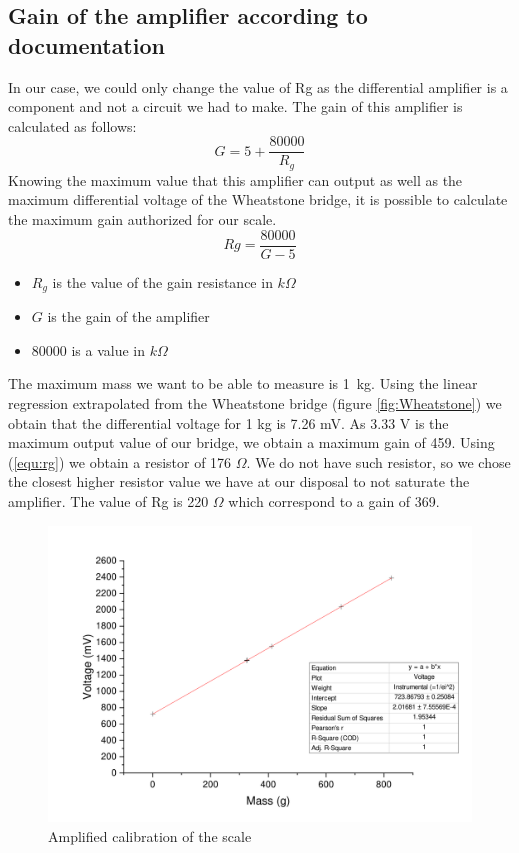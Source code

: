 \documentclass{article}[12pt]
\begin{document}
\subsection{Gain of the amplifier according to documentation}
In our case, we could only change the value of Rg as the differential amplifier is a component and not a circuit we had to make. The gain of this amplifier is calculated as follows:
\begin{equation}
    G=5+\dfrac{80000}{R_g}
\end{equation}
Knowing the maximum value that this amplifier can output as well as the maximum differential voltage of the Wheatstone bridge, it is possible to calculate the maximum gain authorized for our scale.
\begin{equation}
    Rg= \dfrac{80000}{G-5}
    \label{equ:rg}
\end{equation}
\begin{itemize}
    \item $R_g$ is the value of the gain resistance in $k\Omega$
    \item $G$ is the gain of the amplifier
    \item $80000$ is a value in $k\Omega$
\end{itemize}
The maximum mass we want to be able to measure is 1 kg.
Using the linear regression extrapolated from the Wheatstone bridge (figure \ref{fig:Wheatstone}) we obtain that the differential voltage for 1 kg is 7.26 mV.
As 3.33 V is the maximum output value of our bridge, we obtain a maximum gain of 459.
Using (\ref{equ:rg}) we obtain a resistor of 176 $\Omega$. We do not have such resistor, so we chose the closest higher resistor value we have at our disposal to not saturate the amplifier.
The value of Rg is 220 $\Omega$ which correspond to a gain of 369.
\begin{figure}[H]
    \centering
    \includegraphics[width=.6\textwidth]{figures/offset_not_compensated.pdf}
    \caption{Amplified calibration of the scale}
    \label{fig:offset_not_compensated}
\end{figure}
\end{document}

